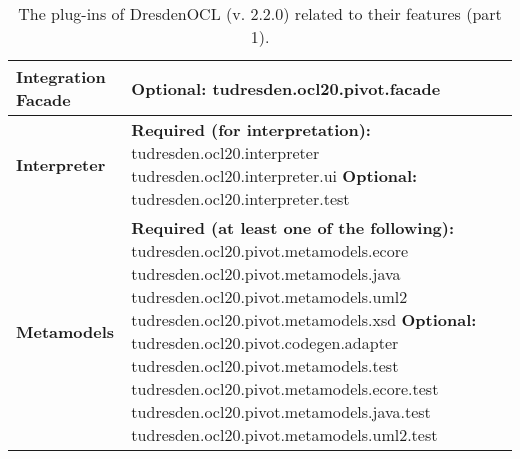\begin{table}[h]
\begin{tabular}{|p{4cm}|p{10cm}|}
    \textbf{Integration Facade} &
    \textbf{Optional:}\newline
    tudresden.ocl20.pivot.facade\\
    \hline

    \textbf{Interpreter} &
    \textbf{Required (for interpretation):}\newline
    tudresden.ocl20.interpreter\newline
    tudresden.ocl20.interpreter.ui\newline\newline
    \textbf{Optional:}\newline
    tudresden.ocl20.interpreter.test\\
    \hline
 
    \textbf{Metamodels} &
    \textbf{Required (at least one of the following):}\newline
    tudresden.ocl20.pivot.metamodels.ecore\newline
    tudresden.ocl20.pivot.metamodels.java\newline
    tudresden.ocl20.pivot.metamodels.uml2\newline\newline
    tudresden.ocl20.pivot.metamodels.xsd\newline\newline
    \textbf{Optional:}\newline
    tudresden.ocl20.pivot.codegen.adapter\newline
    tudresden.ocl20.pivot.metamodels.test\newline
    tudresden.ocl20.pivot.metamodels.ecore.test\newline
    tudresden.ocl20.pivot.metamodels.java.test\newline
    tudresden.ocl20.pivot.metamodels.uml2.test\\
    \hline
 
\end{tabular}
\caption{The plug-ins of DresdenOCL (v. 2.2.0) related to their features (part 1).}
\label{tab:plugins}
\end{table}

